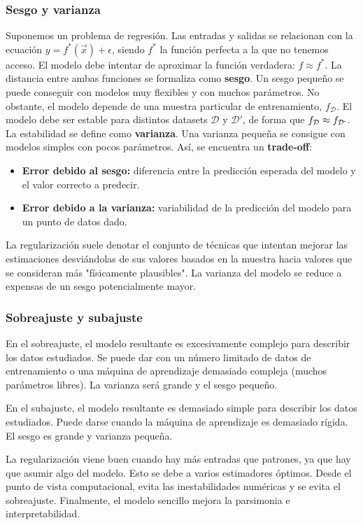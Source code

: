 \subsubsection{Sesgo y varianza}
Suponemos un problema de regresión. Las entradas y salidas se relacionan con la ecuación $y = f^*(\vec{x}) + \epsilon$, siendo $f^*$ la función perfecta a la que no tenemos acceso. El modelo debe intentar de aproximar la función verdadera: $f \approx f^*$. La distancia entre ambas funciones se formaliza como \textbf{sesgo}. Un sesgo pequeño se puede conseguir con modelos muy flexibles y con muchos parámetros. No obstante, el modelo depende de una muestra particular de entrenamiento, $f_{\mathcal{D}}$. El modelo debe ser estable para distintos datasets $\mathcal{D}$ y $\mathcal{D}'$, de forma que $f_{\mathcal{D}} \approx f_{\mathcal{D}`}$. La estabilidad se define como \textbf{varianza}. Una varianza pequeña se consigue con modelos simples con pocos parámetros. Así, se encuentra un \textbf{trade-off}:
\begin{itemize}
\item \textbf{Error debido al sesgo:} diferencia entre la predicción esperada del modelo y el valor correcto a predecir.
\item \textbf{Error debido a la varianza:} variabilidad de la predicción del modelo para un punto de datos dado.
\end{itemize}

La regularización suele denotar el conjunto de técnicas que intentan mejorar las estimaciones desviándolas de sus valores basados en la muestra hacia valores que se consideran más "físicamente plausibles". La varianza del modelo se reduce a expensas de un sesgo potencialmente mayor.

\subsubsection{Sobreajuste y subajuste}
En el sobreajuste, el modelo resultante es excesivamente complejo para describir los datos estudiados. Se puede dar con un número limitado de datos de entrenamiento o una máquina de aprendizaje demasiado compleja (muchos parámetros libres). La varianza será grande y el sesgo pequeño.

En el subajuste, el modelo resultante es demasiado simple para describir los datos estudiados. Puede darse cuando la máquina de aprendizaje es demasiado rígida. El sesgo es grande y varianza pequeña.

La regularización viene buen cuando hay más entradas que patrones, ya que hay que asumir algo del modelo. Esto se debe a varios estimadores óptimos. Desde el punto de vista computacional, evita las inestabilidades numéricas y se evita el sobreajuste. Finalmente, el modelo sencillo mejora la parsimonia e interpretabilidad. 

